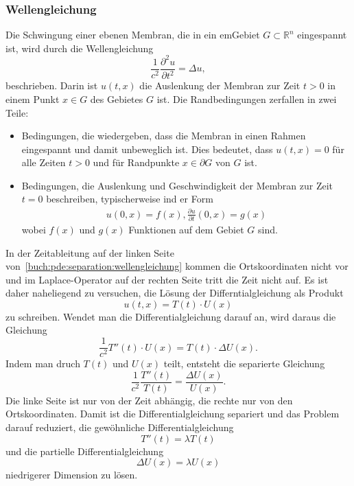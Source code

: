 \subsubsection{Wellengleichung}
Die Schwingung einer ebenen Membran, die in ein emGebiet
$G\subset\mathbb{R}^n$ eingespannt ist, wird durch die
Wellengleichung
\begin{equation}
\frac{1}{c^2} \frac{\partial^2 u}{\partial t^2} = \Delta u,
\label{buch:pde:separation:wellengleichung}
\end{equation}
beschrieben.
Darin ist $u(t,x)$ die Auslenkung der Membran zur Zeit $t>0$ in einem
Punkt $x\in G$ des Gebietes $G$ ist.
Die Randbedingungen zerfallen in zwei Teile:
\begin{itemize}
\item
Bedingungen, die wiedergeben, dass die Membran in einen 
Rahmen eingespannt und damit unbeweglich ist.
Dies bedeutet, dass $u(t,x)=0$ für alle Zeiten $t>0$ und für 
Randpunkte $x\in\partial G$ von $G$ ist.
\item
Bedingungen, die Auslenkung und Geschwindigkeit der Membran zur
Zeit $t=0$ beschreiben, typischerweise ind er Form
\begin{align*}
u(0,x) = f(x),
\frac{\partial u}{\partial t}(0,x) = g(x)
\end{align*}
wobei $f(x)$ und $g(x)$ Funktionen auf dem Gebiet $G$ sind.
\end{itemize}

In der Zeitableitung auf der linken Seite
von~\eqref{buch:pde:separation:wellengleichung}
kommen die Ortskoordinaten nicht vor und im Laplace-Operator
auf der rechten Seite tritt die Zeit nicht auf.
Es ist daher naheliegend zu versuchen, die Lösung der Differntialgleichung
als Produkt
\[
u(t,x) = T(t) \cdot U(x)
\]
zu schreiben.
Wendet man die Differentialgleichung darauf an, wird daraus die Gleichung
\[
\frac{1}{c^2}
T''(t)\cdot U(x)
=
T(t) \cdot \Delta U(x).
\]
Indem man druch $T(t)$ und $U(x)$ teilt, entsteht die separierte Gleichung
\[
\frac{1}{c^2} \frac{T''(t)}{T(t)}
=
\frac{\Delta U(x)}{U(x)}.
\]
Die linke Seite ist nur von der Zeit abhängig, die rechte nur von den
Ortskoordinaten.
Damit ist die Differentialgleichung separiert und das Problem darauf
reduziert, die gewöhnliche Differentialgleichung 
\[
T''(t) = \lambda T(t)
\]
und die partielle Differentialgleichung
\[
\Delta U(x) = \lambda U(x)
\]
niedrigerer Dimension zu lösen.

